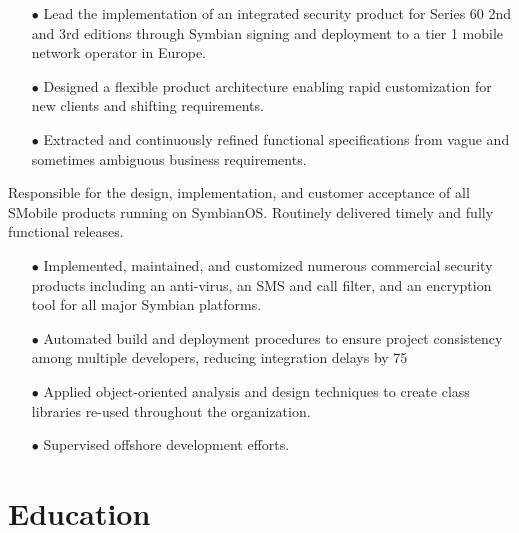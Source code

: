 \documentclass[12pt,letter,roman]{moderncv}
\begin{document}
\begin{itemize}

    \item[$\bullet$] Lead the implementation of an integrated security product for Series
        60 2nd and 3rd editions through Symbian signing and deployment to a tier
        1 mobile network operator in Europe.

    \item[$\bullet$] Designed a flexible product architecture enabling rapid customization
        for new clients and shifting requirements.

    \item[$\bullet$] Extracted and continuously refined functional specifications from vague
        and sometimes ambiguous business requirements.

\end{itemize}

\vspace{0.5em}

Responsible for the design, implementation, and customer acceptance of all
SMobile products running on SymbianOS.  Routinely delivered timely and fully
functional releases.

\begin{itemize}

    \item[$\bullet$] Implemented, maintained, and customized numerous commercial security
        products including an anti-virus, an SMS and call filter, and an
        encryption tool for all major Symbian platforms.

    \item[$\bullet$] Automated build and deployment procedures to ensure project
        consistency among multiple developers, reducing integration delays by
        75%

    \item[$\bullet$] Applied object-oriented analysis and design techniques to create class
        libraries re-used throughout the organization.

    \item[$\bullet$] Supervised offshore development efforts.

\end{itemize}

\section{Education}

\end{document}
